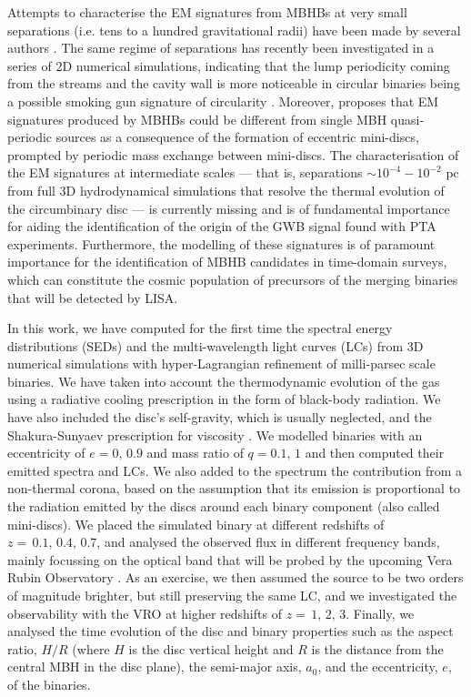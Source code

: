 \documentclass{aa}
\begin{document}
Attempts to characterise the EM signatures from MBHBs at very small separations (i.e. tens to a hundred gravitational radii) have been made by several authors \cite[e.g.][]{Tanaka2012, Tang2018, Ascoli2018,gutierrez2022, 2022ApJ...928..187C,MajorKrauth2023, franchini2024}. The same regime of separations has recently been investigated in a series of 2D numerical simulations, indicating that the lump periodicity coming from the streams and the cavity wall is more noticeable in circular binaries being a possible smoking gun signature of circularity \citep{Westernacher2022}. Moreover, \cite{Westernacher2023} proposes that EM signatures produced by MBHBs could be different from single MBH quasi-periodic sources as a consequence of the formation of eccentric mini-discs, prompted by periodic mass exchange between mini-discs.
The characterisation of the EM signatures at intermediate scales — that is, separations $\sim 10^{-4}-10^{-2}$ pc from full 3D hydrodynamical simulations that resolve the thermal evolution of the circumbinary disc — is currently missing and is of fundamental importance for aiding the identification of the origin of the GWB signal found with PTA experiments. Furthermore, the modelling of these signatures is of paramount importance for the identification of MBHB candidates in time-domain surveys, which can constitute the cosmic population of precursors of the merging binaries that will be detected by LISA.

In this work, we have computed for the first time the spectral energy distributions (SEDs) and the multi-wavelength light curves (LCs) from 3D numerical simulations with hyper-Lagrangian refinement of milli-parsec scale binaries. We have taken into account the thermodynamic evolution of the gas using a  radiative cooling prescription in the form of black-body radiation. We have also included the disc's self-gravity, which is usually neglected, and the Shakura-Sunyaev prescription for viscosity \citep{ShakuraSunyaev1973}. 
We modelled binaries with an eccentricity of $e=0,\,0.9$ and mass ratio of $q = 0.1,\,1$ and then computed their emitted spectra and LCs. 
We also added to the spectrum the contribution from a non-thermal corona, based on the assumption that its emission is proportional to the radiation emitted by the discs around each binary component (also called mini-discs). We placed the simulated binary at different redshifts of $z=\,0.1,\,0.4,\,0.7$, and analysed the observed flux in different frequency bands, mainly focussing on the optical band that will be probed by the upcoming Vera Rubin Observatory  \citep[VRO;][]{LSST2009}. As an exercise, we then assumed the source to be two orders of magnitude brighter, but still preserving the same LC, and we investigated the observability with the VRO at higher redshifts of $z=\,1,\,2,\,3$. 
Finally, we analysed the time evolution of the disc and binary properties such as the aspect ratio, $H/R$ (where $H$ is the disc vertical height and $R$ is the distance from the central MBH in the disc plane), the semi-major axis, $a_0$, and the eccentricity, $e$, of the binaries.
\end{document}
